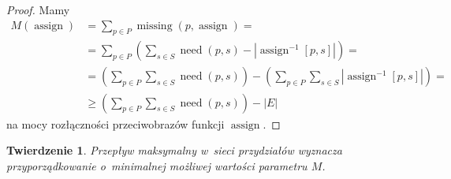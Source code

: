 \documentclass[12pt,a4paper]{article}
\newtheorem{thm}{Twierdzenie}
\theoremstyle{definition}
\DeclareMathOperator{\need}{need}
\DeclareMathOperator{\assign}{assign}
\DeclareMathOperator{\missing}{missing}
\begin{document}
\begin{proof}
Mamy
\begin{align*}
M(\assign) &= \sum_{p \in P} \missing(p, \assign) = \\
&= \sum_{p \in P} \left( \sum_{s \in S} \need(p,s) -
\left| \assign^{-1}[p,s] \right| \right) = \\
&= \left( \sum_{p \in P} \sum_{s \in S} \need(p,s) \right) -
\left(\sum_{p \in P} \sum_{s \in S} \left| \assign^{-1}[p,s] \right|\right) = \\
&\geq \left( \sum_{p \in P} \sum_{s \in S} \need(p,s) \right) - |E|
\end{align*}
na mocy rozłączności przeciwobrazów funkcji $\assign$.
\end{proof}

\begin{thm}
Przepływ maksymalny w~sieci przydziałów wyznacza przyporządkowanie o~minimalnej
możliwej wartości parametru $M$. 
\end{thm}
\end{document}
